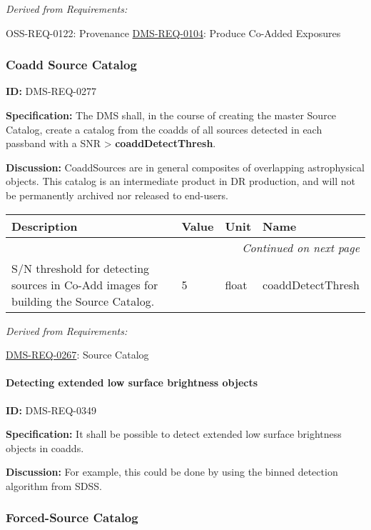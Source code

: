 \documentclass[SE,toc,lsstdraft]{lsstdoc}
\makeatletter
\newcommand{\paramname}[1]{\hspace{0pt}#1}
\newcommand{\unitname}[1]{\hspace{0pt}#1}
\newenvironment{parameters}[0]{%
\setlength\LTleft{0pt}
\setlength\LTright{\fill}
\begin{small}
\begin{longtable}[]{|p{0.5\textwidth}|l|p{0.6in}|p{1.74in}@{}|}

\hline \textbf{Description} & \textbf{Value} & \textbf{Unit} & \textbf{Name} \\ \hline
\endhead

\hline \multicolumn{4}{r}{\emph{Continued on next page}} \\
\endfoot

\hline\hline
\endlastfoot
}{%
\hline
\end{longtable}
\end{small}
}
\makeatother
\begin{document}
\emph{Derived from Requirements:}

OSS-REQ-0122:
Provenance \newline
\hyperref[DMS-REQ-0104]{DMS-REQ-0104}:
Produce Co-Added Exposures \newline


\subsubsection{Coadd Source Catalog}

\label{DMS-REQ-0277}
\textbf{ID:} DMS-REQ-0277

\textbf{Specification:} The DMS shall, in the course of creating the master Source Catalog, create a catalog from the coadds of all sources detected in each passband with a SNR > \textbf{coaddDetectThresh}.

\textbf{Discussion: }CoaddSources are in general composites of overlapping astrophysical objects. This catalog is an intermediate product in DR production, and will not be permanently archived nor released to end-users.



\begin{parameters}
S/N threshold for detecting sources in Co-Add images for building the Source Catalog.
&
5
&
\unitname{%
float
}
&
\paramname{%
coaddDetectThresh
} \\\hline
\end{parameters}




\emph{Derived from Requirements:}

\hyperref[DMS-REQ-0267]{DMS-REQ-0267}:
Source Catalog \newline


\paragraph{Detecting extended  low surface brightness objects}\hfill  %

\label{DMS-REQ-0349}
\textbf{ID:} DMS-REQ-0349

\textbf{Specification: }It shall be possible to detect extended low surface brightness objects in coadds.

\textbf{Discussion: }For example, this could be done by using the binned detection algorithm from SDSS.




\subsubsection{Forced-Source Catalog}
\end{document}
